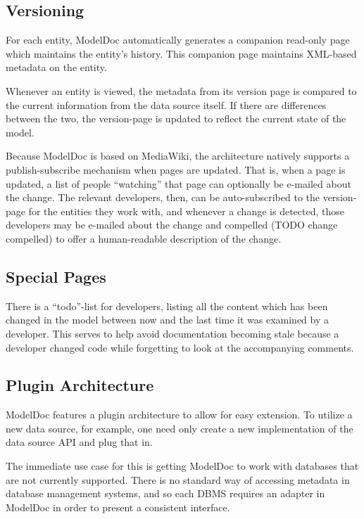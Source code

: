 \documentclass[twocolumn]{article}
\begin{document}
\subsection{Versioning}

For each entity, ModelDoc automatically generates a companion read-only page
which maintains the entity's history.  This companion page maintains XML-based
metadata on the entity.

Whenever an entity is viewed, the metadata from its version page is compared to
the current information from the data source itself.  If there are differences
between the two, the version-page is updated to reflect the current state of
the model.

Because ModelDoc is based on MediaWiki, the architecture natively supports a
publish-subscribe mechanism when pages are updated.  That is, when a page is
updated, a list of people ``watching'' that page can optionally be e-mailed
about the change.  The relevant developers, then, can be auto-subscribed to the
version-page for the entities they work with, and whenever a change is
detected, those developers may be e-mailed about the change and compelled (TODO
change compelled) to offer a human-readable description of the change.

\subsection{Special Pages}

There is a ``todo''-list for developers, listing all the content which has been
changed in the model between now and the last time it was examined by a
developer.  This serves to help avoid documentation becoming stale because a
developer changed code while forgetting to look at the accompanying comments.

\subsection{Plugin Architecture}

ModelDoc features a plugin architecture to allow for easy extension.  To
utilize a new data source, for example, one need only create a new
implementation of the data source API and plug that in.

The immediate use case for this is getting ModelDoc to work with databases that
are not currently supported.  There is no standard way of accessing metadata in
database management systems, and so each DBMS requires an adapter in ModelDoc
in order to present a consistent interface.
\end{document}
